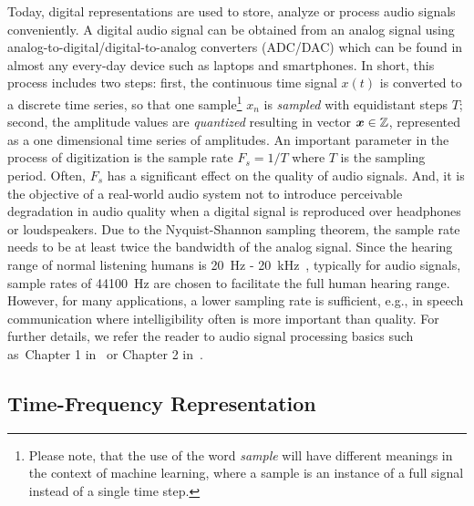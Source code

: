 Today, digital representations are used to store, analyze or process audio signals conveniently.
A digital audio signal can be obtained from an analog signal using analog-to-digital/digital-to-analog converters (ADC/DAC) which can be found in almost any every-day device such as laptops and smartphones.
In short, this process includes two steps: first, the continuous time signal \(x(t)\) is converted to a discrete time series, so that one sample\footnote{Please note, that the use of the word \emph{sample} will have different meanings in the context of machine learning, where a sample is an instance of a full signal instead of a single time step.} \(x_n\) is \emph{sampled} with equidistant steps \(T\); second, the amplitude values are \emph{quantized} resulting in vector \({\bm{x}} \in {\mathbb{Z}}\), represented as a one dimensional time series of amplitudes.
An important parameter in the process of digitization is the sample rate \(F_s = 1/T\) where \(T\) is the sampling period.
Often, \(F_s\) has a significant effect on the quality of audio signals.
And, it is the objective of a real-world audio system not to introduce perceivable degradation in audio quality when a digital signal is reproduced over headphones or loudspeakers.
Due to the Nyquist-Shannon sampling theorem, the sample rate needs to be at least twice the bandwidth of the analog signal.
Since the hearing range of normal listening humans is 20~\si{\hertz} - 20~\si{\kilo\hertz}~\cite{fastl90, moore89}, typically for audio signals, 
sample rates of 44100~\si{\hertz} are chosen to facilitate the full human hearing range.
However, for many applications, a lower sampling rate is sufficient, e.g., in speech communication where intelligibility often is more important than quality.
For further details, we refer the reader to audio signal processing basics such as~Chapter 1 in~\cite{proakis96} or Chapter 2 in~\cite{Mueller15}.

\hypertarget{time-frequency-representation}{%
\subsection{Time-Frequency Representation}\label{sub:time-frequency-representation}}

